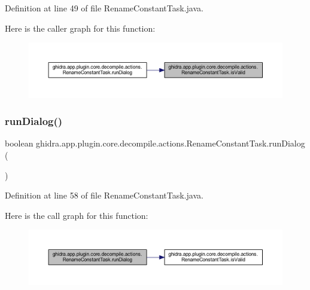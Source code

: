 Definition at line 49 of file Rename\+Constant\+Task.\+java.

Here is the caller graph for this function\+:
\nopagebreak
\begin{figure}[H]
\begin{center}
\leavevmode
\includegraphics[width=350pt]{classghidra_1_1app_1_1plugin_1_1core_1_1decompile_1_1actions_1_1_rename_constant_task_aae1ff61b599481c72a313b2fa3bdcfc7_icgraph}
\end{center}
\end{figure}
\mbox{\label{classghidra_1_1app_1_1plugin_1_1core_1_1decompile_1_1actions_1_1_rename_constant_task_a2ce5a9006ee92b6197de752e2e76afb1}} 
\subsubsection{\texorpdfstring{runDialog()}{runDialog()}}
{\footnotesize\ttfamily boolean ghidra.\+app.\+plugin.\+core.\+decompile.\+actions.\+Rename\+Constant\+Task.\+run\+Dialog (\begin{DoxyParamCaption}{ }\end{DoxyParamCaption})\hspace{0.3cm}{\ttfamily [inline]}}



Definition at line 58 of file Rename\+Constant\+Task.\+java.

Here is the call graph for this function\+:
\nopagebreak
\begin{figure}[H]
\begin{center}
\leavevmode
\includegraphics[width=350pt]{classghidra_1_1app_1_1plugin_1_1core_1_1decompile_1_1actions_1_1_rename_constant_task_a2ce5a9006ee92b6197de752e2e76afb1_cgraph}
\end{center}
\end{figure}


